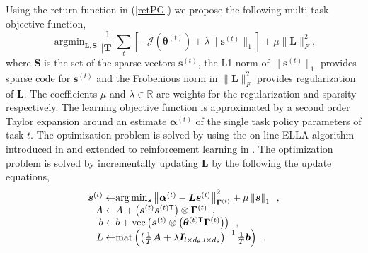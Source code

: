 \documentclass{aamas2016}
\renewcommand{\Re}{\mathbb{R}}
\newcommand{\transpose}{\text{$\mathsf{T}$}}
\DeclareMathOperator*{\argmin}{argmin}
\begin{document}
Using the return function in (\ref{retPG}) we propose the following multi-task objective function,
\begin{displaymath}
 \argmin_{\boldsymbol{L},\boldsymbol{S}}\frac{1}{|\boldsymbol{T}|}\sum_{t}\left[ -\mathcal{J}(\boldsymbol{\theta}^{(t)}) + \lambda \| \boldsymbol{s}^{(t)} \|_{1} \right] + \mu\|\boldsymbol{L}\|_{F}^{2},
\end{displaymath}
where $\boldsymbol{S}$ is the set of the sparse vectors $\boldsymbol{s}^{(t)}$, the L1 norm of $\| \boldsymbol{s}^{(t)} \|_{1}$ 
provides sparse code for $\boldsymbol{s}^{(t)}$ and the Frobenious norm in $\|\boldsymbol{L}\|_{F}^{2}$ provides regularization of $\mathbf{L}$. The
coefficients $\mu$ and $\lambda \in \Re$ are weights for the regularization and sparsity respectively.
The learning objective function is approximated by a second order Taylor expansion around an estimate $\boldsymbol{\alpha}^{(t)}$ of
the single task policy parameters of task $t$. The optimization
problem is solved by using the on-line ELLA algorithm introduced in \cite{Ruvolo2013} and extended to reinforcement 
learning in \cite{BouAmmar2014a}. The optimization problem is solved by incrementally updating $\mathbf{L}$ by the following the
update equations,
\begin{equation}
\begin{array}{r@{}l}
 \boldsymbol{s}^{(t)}  \leftarrow&  \arg\min_{\boldsymbol{s}} \left\| \boldsymbol{\alpha}^{(t)}-\boldsymbol{L}\boldsymbol{s}^{(t)}\right\|_{\boldsymbol{\Gamma}^{(t)}}^{2} + \mu\left\|\boldsymbol{s}\right\|_{1} \enspace, \\%
 A  \leftarrow & A + \left(\boldsymbol{s}^{(t)}\boldsymbol{s}^{(t)\transpose} \right) \otimes \boldsymbol{\Gamma}^{(t)} \enspace, \\%
 b  \leftarrow &b + \mbox{vec}\left(  \boldsymbol{s}^{(t)} \otimes \left( \boldsymbol{\theta}^{(t)\transpose}\boldsymbol{\Gamma}^{(t)} \right) \right) \enspace, \\%
 L \leftarrow& \mbox{mat} \left( \left( \frac{1}{T}\boldsymbol{A} + \lambda\boldsymbol{I}_{l \times d_{\theta},l \times d_{\theta} }\right)^{-1} \frac{1}{T}\boldsymbol{b} \right) \enspace. %
 \label{onlineupdate}
\end{array}
\end{equation}
\end{document}

